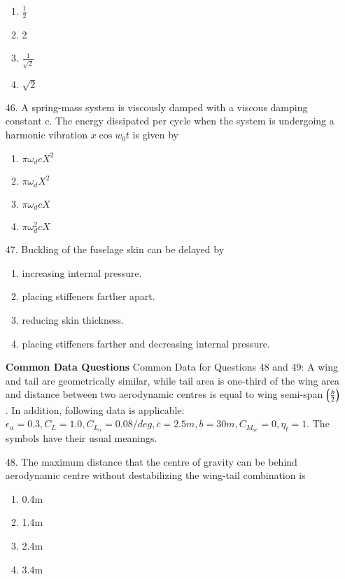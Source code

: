 \documentclass[journal]{IEEEtran}
\begin{document}
\begin{enumerate}
    \begin{enumerate}[label=(\Alph*)]
        \item $\frac{1}{2}$
        \item 2
        \item $\frac{1}{\sqrt{2}}$
        \item $\sqrt{2}$
    \end{enumerate}
    \item[46.] A spring-mass system is viscously damped with a viscous damping constant c. The energy
    dissipated per cycle when the system is undergoing a harmonic vibration $x\cos w_0t$ is given by
    \begin{enumerate}[label=(\Alph*)]
        \item $\pi\omega_dcX^2$
        \item $\pi\omega_dX^2$
        \item $\pi\omega_dcX$
        \item $\pi\omega_d^2cX$
    \end{enumerate}
    \item[47.] Buckling of the fuselage skin can be delayed by
    \begin{enumerate}[label=(\Alph*)]
        \item  increasing internal pressure. 
        \item placing stiffeners farther apart. 
        \item  reducing skin thickness. 
        \item  placing stiffeners farther and decreasing internal pressure. 
    \end{enumerate} 
    \textbf{Common Data Questions}
    Common Data for Questions 48 and 49:
    A wing and tail are geometrically similar, while tail area is one-third of the wing area and distance between
two aerodynamic centres is equal to wing semi-span $\left(\frac{b}{2}\right)$. In addition, following data is applicable: 
$\epsilon_{\alpha}=0.3,C_L = 1.0,C_{L_{\alpha}} = 0.08/deg, \bar{c}=2.5m, b=30m,C_{M_{ac}}=0, \eta_t = 1$. The symbols have their usual meanings.
    \item[48.] The maximum distance that the centre of gravity can be behind aerodynamic centre without
    destabilizing the wing-tail combination is     
    \begin{enumerate}[label=(\Alph*)]
        \item 0.4m
        \item 1.4m
        \item 2.4m
        \item 3.4m

\end{enumerate}
\end{enumerate}
\end{document}
